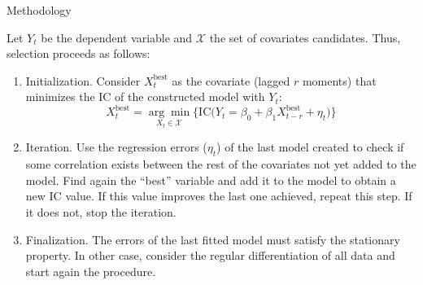 \documentclass[10pt]{beamer}
\begin{document}
\begin{frame}{Methodology}
    

    Let $Y_t$ be the dependent variable and $\mathcal{X}$ the set of covariates candidates. Thus, selection proceeds as follows:
    
    \begin{enumerate}
        \item Initialization. Consider $X_t^\text{best}$ as the covariate (lagged $r$ moments) that minimizes the IC of the constructed model with $Y_t$:
        \[ X_t^\text{best} = \underset{X_t\in\mathcal{X}}{\arg\min} \Bigg\{ \text{IC}\Bigg( Y_t = \beta_0 + \beta_1 X_{t-r}^\text{best} + \eta_t \Bigg)\Bigg\} \] 
        \item Iteration. Use the regression errors ($\eta_t$) of the last model created to check if some correlation exists between the rest of the covariates not yet added to the model. Find again the ``best'' variable and add it to the model to obtain a new IC value. If this value improves the last one achieved, repeat this step. If it does not, stop the iteration.
        \item Finalization. The errors of the last fitted model must satisfy the stationary property. In other case, consider the regular differentiation of all data and start again the procedure.
    \end{enumerate}
\end{frame}
\end{document}
